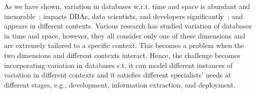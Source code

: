 As we have shown, 
variation in databases w.r.t. time and space is abundant and inexorable~\cite{dbDecay16Stonebraker};
impacts DBAs, data scientists, and developers significantly~\cite{dbSPLevolve}; 
and appears in different contexts. Various research has studied variation of databases
in time and space, however, they all consider only one of these dimensions and
are extremely tailored to a specific context. This becomes a problem when 
the two dimensions and different contexts interact. Hence, the challenge becomes
incorporating variation in databases s.t. it can model different instances of variation
in different contexts and it satisfies different specialists' needs at different stages,
e.g., development, information extraction, and deployment. 
%
